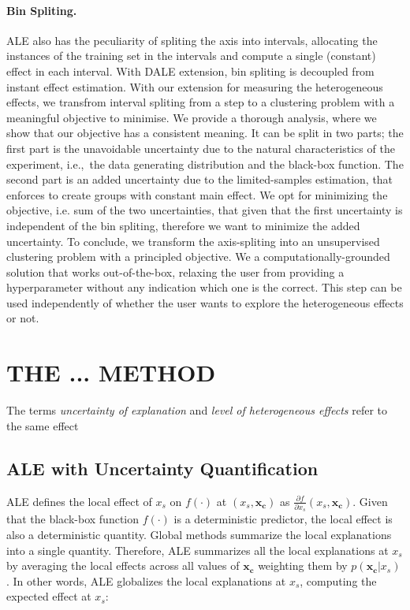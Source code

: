 \documentclass[twoside]{article}
\newcommand{\dfdx}{\frac{\partial f}{\partial x_s}}
\newcommand{\xc}{\mathbf{x_c}}
\begin{document}
\paragraph{Bin Spliting.} ALE also has the peculiarity of spliting the
axis into intervals, allocating the instances of the training set in
the intervals and compute a single (constant) effect in each
interval. With DALE extension, bin spliting is decoupled from instant
effect estimation. With our extension for measuring the heterogeneous
effects, we transfrom interval spliting from a step to a clustering
problem with a meaningful objective to minimise. We provide a thorough
analysis, where we show that our objective has a consistent
meaning. It can be split in two parts; the first part is the
unavoidable uncertainty due to the natural characteristics of the
experiment, i.e.,~the data generating distribution and the black-box
function. The second part is an added uncertainty due to the
limited-samples estimation, that enforces to create groups with
constant main effect. We opt for minimizing the objective, i.e. sum of
the two uncertainties, that given that the first uncertainty is
independent of the bin spliting, therefore we want to minimize the
added uncertainty. To conclude, we transform the axis-spliting into an
unsupervised clustering problem with a principled objective. We a
computationally-grounded solution that works out-of-the-box, relaxing
the user from providing a hyperparameter without any indication which
one is the correct. This step can be used independently of whether the
user wants to explore the heterogeneous effects or not.

\section{THE ... METHOD}

The terms \textit{uncertainty of explanation} and \textit{level of
  heterogeneous effects} refer to the same effect 

\subsection{ALE with Uncertainty Quantification}

ALE defines the local effect of \(x_s\) on \(f(\cdot)\) at
\((x_s, \xc)\) as \(\dfdx (x_s, \xc)\). Given that the black-box
function \(f(\cdot)\) is a deterministic predictor, the local effect
is also a deterministic quantity. Global methods summarize the local
explanations into a single quantity. Therefore, ALE summarizes all the
local explanations at \(x_s\) by averaging the local effects across
all values of \(\xc\) weighting them by \(p(\xc|x_s)\). In other
words, ALE globalizes the local explanations at \(x_s\), computing the
expected effect at \(x_s\):
\end{document}
